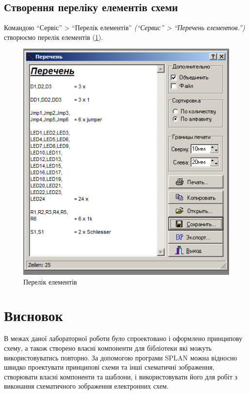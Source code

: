 \newpage
\NoBorder
\label{lab2:pdf:element_1}

\label{lab2:pdf:element_1_2}

\newpage
\BorderText \restoregeometry


\subsection{Створення переліку  елементів схеми}

Командою ``Сервіс'' > ``Перелік елементів'' \textit{(``Сервис'' > ``Перечень елементов.'')}
створюємо перелік елементів (\ref{fig:lab2:elements_list}).
\begin{figure}[!htb]
  \centering \includegraphics[width=0.4\linewidth]{./images/lab2/elements_list.png}
  \caption{Перелік елементів}
  \label{fig:lab2:elements_list}
\end{figure}
\FloatBarrier

\newpage
\section*{Висновок}

В межах даної лабораторної роботи було спроектовано і оформлено принципову схему, а також створено
власні компоненти для бібліотеки які можуть використовуватись повторно.  За допомогою програми SPLAN
можна відносно швидко проектувати принципові схеми та інші схематичні зображення, створювати власні
компоненти та шаблони, і використовувати його для робіт з виконання схематичного зображення
електронних схем.

